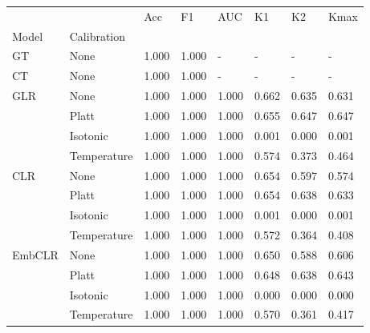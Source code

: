 \begin{tabular}{llllllll}
\toprule
 &  & Acc & F1 & AUC & K1 & K2 & Kmax \\
Model & Calibration &  &  &  &  &  &  \\
\midrule
GT & None & 1.000 & 1.000 & - & - & - & - \\
\cline{1-8}
CT & None & 1.000 & 1.000 & - & - & - & - \\
\cline{1-8}
\multirow[t]{4}{*}{GLR} & None & 1.000 & 1.000 & 1.000 & 0.662 & 0.635 & 0.631 \\
 & Platt & 1.000 & 1.000 & 1.000 & 0.655 & 0.647 & 0.647 \\
 & Isotonic & 1.000 & 1.000 & 1.000 & 0.001 & 0.000 & 0.001 \\
 & Temperature & 1.000 & 1.000 & 1.000 & 0.574 & 0.373 & 0.464 \\
\cline{1-8}
\multirow[t]{4}{*}{CLR} & None & 1.000 & 1.000 & 1.000 & 0.654 & 0.597 & 0.574 \\
 & Platt & 1.000 & 1.000 & 1.000 & 0.654 & 0.638 & 0.633 \\
 & Isotonic & 1.000 & 1.000 & 1.000 & 0.001 & 0.000 & 0.001 \\
 & Temperature & 1.000 & 1.000 & 1.000 & 0.572 & 0.364 & 0.408 \\
\cline{1-8}
\multirow[t]{4}{*}{EmbCLR} & None & 1.000 & 1.000 & 1.000 & 0.650 & 0.588 & 0.606 \\
 & Platt & 1.000 & 1.000 & 1.000 & 0.648 & 0.638 & 0.643 \\
 & Isotonic & 1.000 & 1.000 & 1.000 & 0.000 & 0.000 & 0.000 \\
 & Temperature & 1.000 & 1.000 & 1.000 & 0.570 & 0.361 & 0.417 \\
\cline{1-8}
\bottomrule
\end{tabular}
